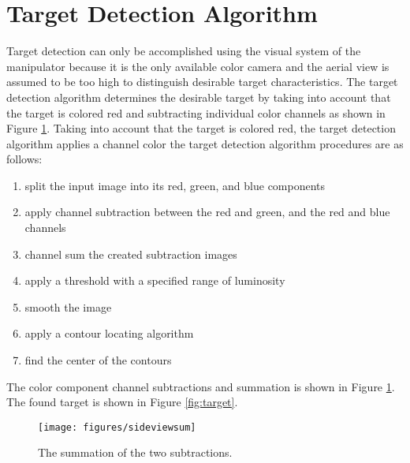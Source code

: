   \section{Target Detection Algorithm}
    Target detection can only be accomplished using the visual system of the 
      manipulator because it is the only available color camera and the aerial 
      view is assumed to be too high to distinguish desirable target 
      characteristics.
    The target detection algorithm determines the desirable target by taking 
      into account that the target is colored red and subtracting individual 
      color channels as shown in Figure \ref{fig:operation}.
    Taking into account that the target is colored red,
     the target detection algorithm applies a channel color
     the target detection algorithm procedures are as follows:
    \begin{enumerate}
     \item split the input image into its red, green, and blue
        components
     \item apply channel subtraction between the red and green, and
     the red and blue channels
     \item channel sum the created subtraction images
     \item apply a threshold with a specified range of luminosity
     \item smooth the image
     \item apply a contour locating algorithm
     \item find the center of the contours
    \end{enumerate}
    The color component channel subtractions and summation is
      shown in Figure \ref{fig:operation}.
    The found target is shown in Figure \ref{fig:target}.

    \begin{figure}%
    \begin{center}
    \centerline{\texttt{[image: figures/sideviewsum]}}
    \caption{The summation of the two subtractions.}
    \label{fig:operation}
    \end{center}
    \end{figure}


